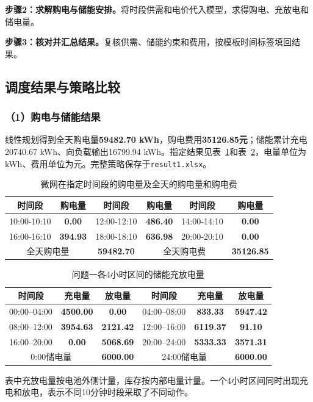 \noindent\textbf{步骤2：求解购电与储能安排。}将时段供需和电价代入模型，求得购电、充放电和储电量。

\noindent\textbf{步骤3：核对并汇总结果。}复核供需、储能约束和费用，按模板时间标签填回结果。

\subsection{调度结果与策略比较}
\subsubsection*{（1）购电与储能结果}
线性规划得到全天购电量\textbf{59482.70 kWh}，购电费用\textbf{35126.85元}；储能累计充电20740.67 kWh、向负载输出16799.94 kWh。指定结果见表~\ref{tab:q1_purchase_result}和表~\ref{tab:q1_storage_result}，电量单位为kWh、费用单位为元。完整策略保存于\texttt{result1.xlsx}。
\begin{table}[!htbp]
    \centering
    \caption{微网在指定时间段的购电量及全天的购电量和购电费 }
    \label{tab:q1_purchase_result}
    \begin{tabular}{|c|c|c|c|c|c|}
        \hline
        时间段 & 购电量 & 时间段 & 购电量 & 时间段 & 购电量 \\
        \hline
        10:00-10:10 & \textbf{0.00} & 12:00-12:10 & \textbf{486.40} & 14:00-14:10 & \textbf{0.00} \\
        \hline
        16:00-16:10 & \textbf{394.93} & 18:00-18:10 & \textbf{636.98} & 20:00-20:10 & \textbf{0.00} \\
        \hline
        \multicolumn{2}{|c|}{全天购电量} & \multicolumn{1}{c|}{\textbf{59482.70}} & \multicolumn{2}{c|}{全天购电费} & \multicolumn{1}{c|}{\textbf{35126.85}}\\
        \hline
    \end{tabular}
\end{table}
\begin{table}[!htbp]
    \centering
    \caption{问题一各4小时区间的储能充放电量}
    \label{tab:q1_storage_result}
    \begin{tabular}{|c|c|c|c|c|c|}
        \hline
        时间段 & 充电量 & 放电量 & 时间段 & 充电量 & 放电量 \\
        \hline
        00:00--04:00 & \textbf{4500.00} & \textbf{0.00} & 04:00--08:00 & \textbf{833.33} & \textbf{5947.42} \\
        \hline
        08:00--12:00 & \textbf{3954.63} & \textbf{2121.42} & 12:00--16:00 & \textbf{6119.37} & \textbf{91.10} \\
        \hline
        16:00--20:00 & \textbf{0.00} & \textbf{5068.69} & 20:00--24:00 & \textbf{5333.33} & \textbf{3571.31} \\
        \hline
        \multicolumn{2}{|c|}{0:00储电量} & \multicolumn{1}{|c|}{\textbf{6000.00}} & \multicolumn{2}{c|}{24:00储电量} & \multicolumn{1}{c|}{\textbf{6000.00}}\\
        \hline
    \end{tabular}
\end{table}
表中充放电量按电池外侧计量，库存按内部电量计量。一个4小时区间同时出现充电和放电，表示不同10分钟时段采取了不同动作。

